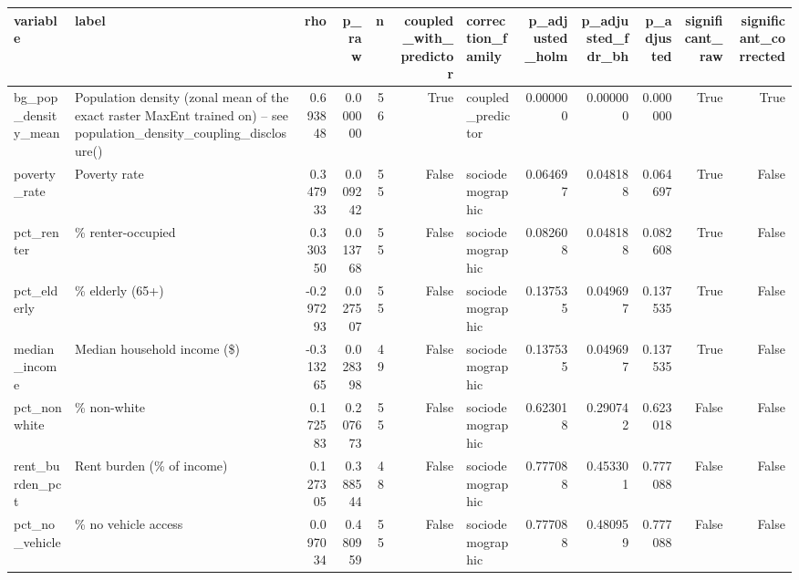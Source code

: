 \begin{tabular}{llrrrrlrrrrr}
\toprule
variable & label & rho & p\_raw & n & coupled\_with\_predictor & correction\_family & p\_adjusted\_holm & p\_adjusted\_fdr\_bh & p\_adjusted & significant\_raw & significant\_corrected \\
\midrule
bg\_pop\_density\_mean & Population density (zonal mean of the exact raster MaxEnt trained on) -- see population\_density\_coupling\_disclosure() & 0.693848 & 0.000000 & 56 & True & coupled\_predictor & 0.000000 & 0.000000 & 0.000000 & True & True \\
poverty\_rate & Poverty rate & 0.347933 & 0.009242 & 55 & False & sociodemographic & 0.064697 & 0.048188 & 0.064697 & True & False \\
pct\_renter & \% renter-occupied & 0.330350 & 0.013768 & 55 & False & sociodemographic & 0.082608 & 0.048188 & 0.082608 & True & False \\
pct\_elderly & \% elderly (65+) & -0.297293 & 0.027507 & 55 & False & sociodemographic & 0.137535 & 0.049697 & 0.137535 & True & False \\
median\_income & Median household income (\$) & -0.313265 & 0.028398 & 49 & False & sociodemographic & 0.137535 & 0.049697 & 0.137535 & True & False \\
pct\_nonwhite & \% non-white & 0.172583 & 0.207673 & 55 & False & sociodemographic & 0.623018 & 0.290742 & 0.623018 & False & False \\
rent\_burden\_pct & Rent burden (\% of income) & 0.127305 & 0.388544 & 48 & False & sociodemographic & 0.777088 & 0.453301 & 0.777088 & False & False \\
pct\_no\_vehicle & \% no vehicle access & 0.097034 & 0.480959 & 55 & False & sociodemographic & 0.777088 & 0.480959 & 0.777088 & False & False \\
\bottomrule
\end{tabular}
